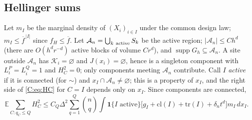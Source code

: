 \documentclass[11pt]{article}
\newcommand{\E}{\mathbb{E}}
\newcommand{\cK}{\mathcal{K}}
\newcommand{\abs}[1]{\lvert #1\rvert}
\newcommand{\one}{\mathbf{1}}
\begin{document}
\subsection{Hellinger sums}
Let \(m_I\) be the marginal density of \((X_i)_{i\in I}\) under the common
design law; \(m_I\le\overline f^{\,\abs I}\) since \(f_H\le\overline f\).
Let \(\mathcal A_n=\bigcup_{k\ \rm active}S_k\) be the active region;
\(\abs{\mathcal A_n}\le C h^d\) (there are \(O(h^dr^{-d})\) active blocks of
volume \(Cr^d\)), and \(\operatorname{supp}G_h\subseteq\mathcal A_n\).  A
site outside \(\mathcal A_n\) has \(\cK_i=\varnothing\) and
\(J(x_i)=\varnothing\), hence is a singleton component with
\(L^P_i=L^Q_i=1\) and \(H^2_C=0\); only components meeting
\(\mathcal A_n\) contribute.  Call \(I\) \emph{active} if it is connected
(for \(\sim\)) and \(x_I\cap\mathcal A_n\ne\varnothing\); this is a property
of \(x_I\), and the right side of \eqref{C:eq:HC} for \(C=I\) depends only
on \(x_I\).  Since components are connected,
\begin{equation}
 \E\sum_{C:q_C\le Q}H^2_C
 \le C_Q\Delta^2\sum_{q=1}^Q\binom nq\int\one\{I\text{ active}\}\bigl[g_I+\mathrm{cl}(I)+\mathrm{tr}(I)+\delta_nt^d\bigr]m_I\,dx_I .
 \label{C:eq:hell-sum}
\end{equation}
\end{document}

